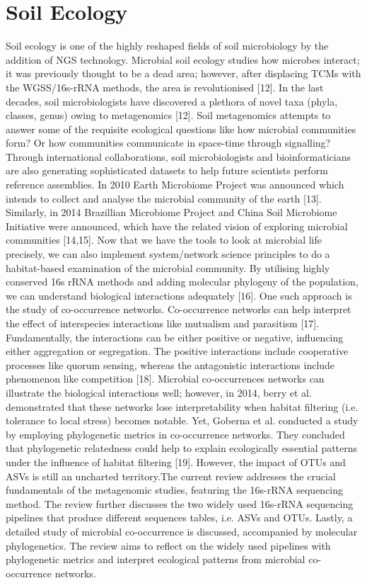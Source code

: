 \section{Soil Ecology}
Soil ecology is one of the highly reshaped fields of soil microbiology by the addition of NGS technology. Microbial soil ecology studies how microbes interact; it was previously thought to be a dead area; however, after displacing TCMs with the WGSS/16s-rRNA methods, the area is revolutionised [12]. In the last decades, soil microbiologists have discovered a plethora of novel taxa (phyla, classes, genus) owing to metagenomics [12]. Soil metagenomics attempts to answer some of the requisite ecological questions like how microbial communities form? Or how communities communicate in space-time through signalling? Through international collaborations, soil microbiologists and bioinformaticians are also generating sophisticated datasets to help future scientists perform reference assemblies. In 2010 Earth Microbiome Project was announced which intends to collect and analyse the microbial community of the earth [13]. Similarly, in 2014 Brazillian Microbiome Project and China Soil Microbiome Initiative were announced, which have the related vision of exploring microbial communities [14,15]. Now that we have the tools to look at microbial life precisely, we can also implement system/network science principles to do a habitat-based examination of the microbial community. By utilising highly conserved 16s rRNA methods and adding molecular phylogeny of the population, we can understand biological interactions adequately [16]. One such approach is the study of co-occurrence networks. Co-occurrence networks can help interpret the effect of interspecies interactions like mutualism and parasitism [17]. Fundamentally, the interactions can be either positive or negative, influencing either aggregation or segregation. The positive interactions include cooperative processes like quorum sensing, whereas the antagonistic interactions include phenomenon like competition [18]. Microbial co-occurrences networks can illustrate the biological interactions well; however, in 2014, berry et al. demonstrated that these networks lose interpretability when habitat filtering (i.e. tolerance to local stress) becomes notable. Yet, Goberna et al. conducted a study by employing phylogenetic metrics in co-occurrence networks. They concluded that phylogenetic relatedness could help to explain ecologically essential patterns under the influence of habitat filtering [19]. However, the impact of OTUs and ASVs is still an uncharted territory.\newline \newline The current review addresses the crucial fundamentals of the metagenomic studies, featuring the 16s-rRNA sequencing method. The review further discusses the two widely used 16s-rRNA sequencing pipelines that produce different sequences tables, i.e. ASVs and OTUs. Lastly, a detailed study of microbial co-occurrence is discussed, accompanied by molecular phylogenetics. The review aims to reflect on the widely used pipelines with phylogenetic metrics and interpret ecological patterns from microbial co-occurrence networks.